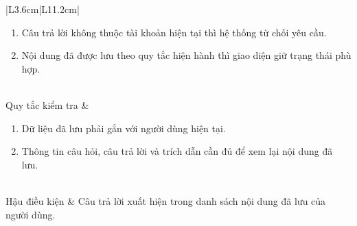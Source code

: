 \documentclass[12pt,a4paper,oneside]{report}
\begin{document}
{\begin{longtable}{|L{3.6cm}|L{11.2cm}|}
\begin{enumerate}[leftmargin=*,nosep]
                            \item Câu trả lời không thuộc tài khoản hiện tại thì hệ thống từ chối yêu cầu.
                            \item Nội dung đã được lưu theo quy tắc hiện hành thì giao diện giữ trạng thái phù hợp.
                          \end{enumerate}                         \\
    \hline
    Quy tắc kiểm tra    & \begin{enumerate}[leftmargin=*,nosep]
                            \item Dữ liệu đã lưu phải gắn với người dùng hiện tại.
                            \item Thông tin câu hỏi, câu trả lời và trích dẫn cần đủ để xem lại nội dung đã lưu.
                          \end{enumerate}                            \\
    \hline
    Hậu điều kiện       & Câu trả lời xuất hiện trong danh sách nội dung đã lưu của người dùng.                                          \\
    \hline
  \end{longtable}
}
\end{document}
